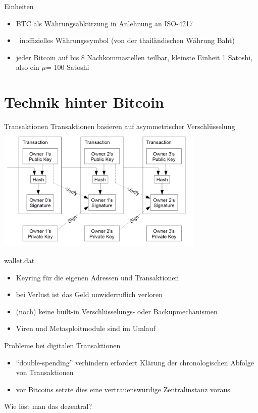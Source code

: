 \documentclass[handout]{beamer} \usepackage[german]{babel}
\begin{document}
\begin{frame}{Einheiten}
	\begin{itemize}
		\item BTC als Währungsabkürzung in Anlehnung an ISO-4217
		\item \textbaht \ inoffizielles Währungssymbol (von der thailändischen Währung Baht)
		\item jeder Bitcoin auf bis 8 Nachkommastellen teilbar, kleinste Einheit
			1 Satoshi, also ein $\mu$\textbaht = 100 Satoshi
	\end{itemize}
\end{frame}

\section{Technik hinter Bitcoin}
\begin{frame}{Transaktionen}
	Transaktionen basieren auf asymmetrischer Verschlüsselung
	\includegraphics[height=60mm]{btcvortrag/TransactionChain.png}
\end{frame}

\begin{frame}{wallet.dat}
	\begin{itemize}
		\item Keyring für die eigenen Adressen und Transaktionen
		\item bei Verlust ist das Geld unwiderruflich verloren
		\item (noch) keine built-in Verschlüsselungs- oder Backupmechanismen
		\item Viren und Metasploitmodule sind im Umlauf
	\end{itemize}
\end{frame}


\begin{frame}{Probleme bei digitalen Transaktionen}
	\begin{itemize}
		\item "`double-spending"' verhindern erfordert Klärung der chronologischen Abfolge von Transaktionen
		\item vor Bitcoins setzte dies eine vertrauenswürdige Zentralinstanz
			voraus
	\end{itemize}
	Wie löst man das dezentral?
\end{frame}
\end{document}
